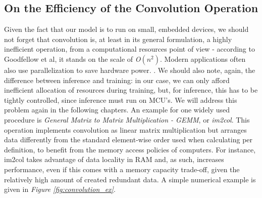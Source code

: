 \subsection{On the Efficiency of the Convolution Operation}
Given the fact that our model is to run on small, embedded devices, we should not forget that convolution is, at least in its general formulation, a highly inefficient operation, from a computational resources point of view - according to Goodfellow et al, it stands on the scale of \textit{O\((n^2)\)}. Modern applications often also use parallelization to save hardware power. \cite{Goodfellow-et-al-2016}. We should also note, again, the difference between inference and training: in our case, we can only afford inefficient allocation of resources during training, but, for inference, this has to be tightly controlled, since inference must run on MCU's. We will address this problem again in the following chapters. An example for one widely used procedure is \textit{General Matrix to Matrix Multiplication - GEMM}, or \textit{im2col}. This operation implements convolution as linear matrix multiplication but arranges data differently from the standard element-wise order used when calculating per definition, to benefit from the memory access policies of computers. For instance, im2col takes advantage of data locality in RAM and, as such, increases performance, even if this comes with a memory capacity trade-off, given the relatively high amount of created redundant data. \cite{pete_warden_gemm}
A simple numerical example is given in \textit{Figure \ref{fig:convolution_ex}}. 

